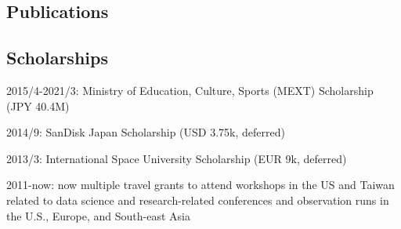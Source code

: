 \documentclass[12pt,letterpaper]{article}
\begin{document}
\ifdefined\withpubs
  \subsection{Publications}
  
  \begin{list}{}{\cvlist}
    
  \end{list}

\fi

\subsection{Scholarships}
\begin{list}{}{\cvlist}
    \item 2015/4-2021/3: Ministry of Education, Culture, Sports (MEXT) Scholarship (JPY 40.4M)
    \item 2014/9: SanDisk Japan Scholarship (USD 3.75k, deferred)
    \item 2013/3: International Space University Scholarship (EUR 9k, deferred)
    \item 2011-now: now multiple travel grants to attend workshops in the US and Taiwan related to data science and research-related conferences and observation runs in the U.S., Europe, and South-east Asia
\end{list}

\end{document}
